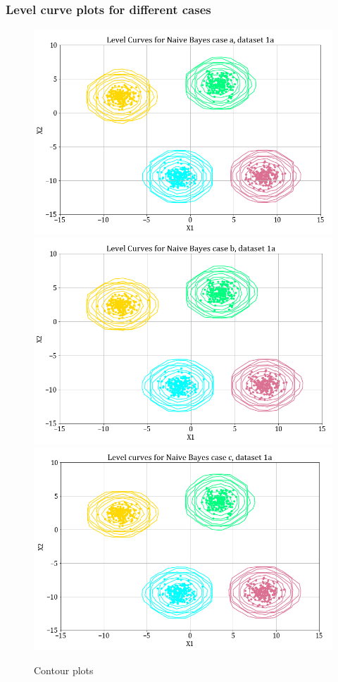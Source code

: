 \documentclass[11pt,a4paper]{article}
\begin{document}
\subsubsection{Level curve plots for different cases}

\begin{figure}[H]
    \centering
    \includegraphics[scale=0.4]{images/contour1b_case1.png}
    \includegraphics[scale=0.4]{images/contour1b_case2.png}
    \includegraphics[scale=0.4]{images/contour1b_case3.png}
    \caption{Contour plots}
    \label{fig:cp_1}
\end{figure}
\end{document}
